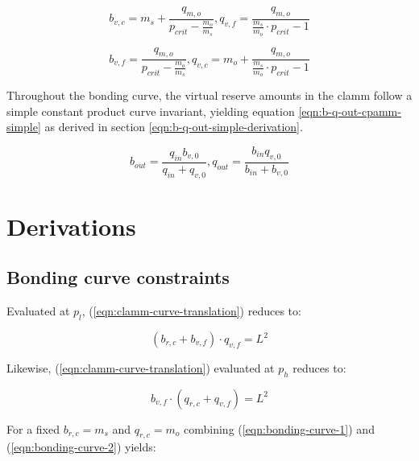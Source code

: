 \documentclass[table, twocolumn]{article}
\begin{document}
\begin{equation} \label{eqn:bonding-curve-setup}
  b_{v, c} = m_s + \frac{q_{m, o}}{p_{crit} - \frac{m_o}{m_s}},
  q_{v, f} = \frac{q_{m, o}}{\frac{m_s}{m_o} \cdot p_{crit} - 1}
\end{equation}

\begin{equation} \label{eqn:bonding-curve-transition}
  b_{v, f} = \frac{q_{m, o}}{p_{crit} - \frac{m_o}{m_s}},
  q_{v, c} = m_o + \frac{q_{m, o}}{\frac{m_s}{m_o} \cdot p_{crit} - 1}
\end{equation}

Throughout the bonding curve, the virtual reserve amounts in the \gls{clamm} follow a
simple constant product curve invariant, yielding equation
\ref{eqn:b-q-out-cpamm-simple} as derived in section
\ref{eqn:b-q-out-simple-derivation}.

\begin{equation} \label{eqn:b-q-out-cpamm-simple}
  b_{out} = \frac{q_{in} b_{v, 0}}{q_{in} + q_{v, 0}},
  q_{out} = \frac{b_{in} q_{v, 0}}{b_{in} + b_{v, 0}}
\end{equation}

\section{Derivations}

\subsection{Bonding curve constraints} \label{sec:bonding-curve-constraints}

Evaluated at $p_l$, (\ref{eqn:clamm-curve-translation}) reduces to:

\begin{equation} \label{eqn:bonding-curve-1}
  (b_{r, c} + b_{v, f}) \cdot q_{v, f} = L^2
\end{equation}

Likewise, (\ref{eqn:clamm-curve-translation}) evaluated at $p_h$ reduces to:

\begin{equation} \label{eqn:bonding-curve-2}
  b_{v, f} \cdot (q_{r, c} + q_{v, f}) = L^2
\end{equation}

For a fixed $b_{r, c} = m_s$ and $q_{r, c} = m_o$ combining (\ref{eqn:bonding-curve-1})
and (\ref{eqn:bonding-curve-2}) yields:
\end{document}
